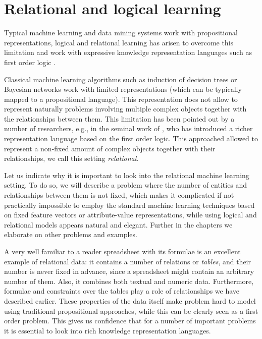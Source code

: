 \section{Relational and logical learning}
Typical machine learning and data mining systems work with propositional representations, logical and relational learning has arisen to overcome this limitation and work with expressive knowledge representation languages such as first order logic \parencite{luc_book}.

Classical machine learning algorithms such as induction of decision trees
\parencite{decision_trees} or Bayesian networks \parencite{pearl} work with limited representations (which can be typically mapped to a propositional language). This representation does not allow to represent naturally problems involving multiple complex objects together with the relationships between them. This limitation has been pointed out by a number of researchers, e.g., in the seminal work of \textcite{plotkin}, who has introduced a richer representation language based on the first order logic. This approached allowed to represent a non-fixed amount of complex objects together with their relationships, we call this setting \textit{relational}.

Let us indicate why it is important to look into the relational
machine learning setting. To do so, we will describe a problem where
the number of entities and relationships between them is not fixed,
which makes it complicated if not practically impossible to employ the
standard machine learning techniques based on  fixed feature vectors
or attribute-value representations, while using logical and relational models appears natural and elegant. Further in the chapters we elaborate on other problems and examples.

A very well familiar to a reader spreadsheet with its formulae is an excellent example of relational data: it contains a number of relations or \textit{tables}, and their number is never fixed in advance, since a spreadsheet might contain an arbitrary number of them. Also, it combines both textual and numeric data. Furthermore, formulae and constraints over the tables play a role of relationships we have described earlier. These properties of the data itself make problem hard to model using traditional propositional approaches, while this can be clearly seen as a first order problem. This gives us confidence that for a number of important problems it is essential to look into rich knowledge representation languages.

